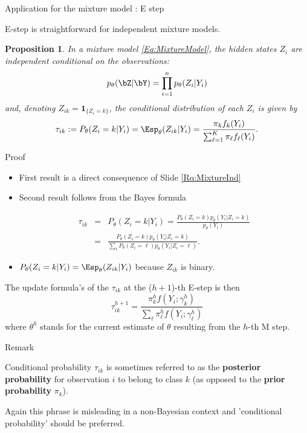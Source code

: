 \documentclass[compress,10pt]{beamer}
\newtheorem{proposition}{Proposition}
\begin{document}
 
\begin{frame}{Application for the mixture model : E step}
 
 E-step is straightforward for independent mixture models.
\label{Prop:LowerBound}
\begin{proposition} %
  In a mixture model \eqref{Eq:MixtureModel}, the hidden states $Z_i$ are independent conditional on the observations:
  $$
  p_\theta(\bZ|\bY) = \prod_{i=1}^n p_\theta(Z_i | Y_i)
  $$
  and, denoting $Z_{ik} = \mathbf{1}_{\{Z_i = k\}}$, the conditional distribution of each $Z_i$ is given by
  $$
  \tau_{ik} := P_\theta(Z_i = k | Y_i) = \Esp_\theta(Z_{ik} | Y_i) = \frac{\pi_k f_k(Y_i)}{\sum_{\ell = 1}^K \pi_\ell f_\ell(Y_i)}.
  $$
\end{proposition}
\end{frame}

\begin{frame}[allowframebreaks]{Proof}

\begin{itemize}
 \item First result is a direct consequence of Slide \ref{Rq:MixtureInd}
\item  Second result  follows from the Bayes formula

 
\begin{eqnarray*}
 \tau_{ik} &=& P_\theta(Z_i = k | Y_i) = \frac{P_\theta(Z_i = k) p_\theta(Y_i | Z_i = k)}{p_\theta(Y_i)} \\
 &=& \frac{P_\theta(Z_i = k) p_\theta(Y_i | Z_i = k)}{\sum_\ell P_\theta(Z_i = \ell) p_\theta(Y_i | Z_i = \ell)}.
\end{eqnarray*}

\item $P_\theta(Z_i = k | Y_i) = \Esp_\theta(Z_{ik} | Y_i)$   because $Z_{ik}$ is binary.
\end{itemize}


The update formula's of the $\tau_{ik}$ at the ($h+1$)-th E-step is then
$$
\tau^{h+1}_{ik} = \frac{{\pi}^h_k f(Y_i; {\gamma}^h_k)}{\sum_\ell {\pi}^h_\ell f(Y_i; {\gamma}^h_\ell)}
$$
where $\theta^h$ stands for the current estimate of $\theta$ resulting from the $h$-th M step.

\end{frame}


\begin{frame}{Remark}
 
 
Conditional probability $\tau_{ik}$ is sometimes referred to as the \textbf{\color{dgreen}  posterior probability} for observation $i$ to belong to class $k$ (as opposed to the \textbf{\color{dgreen} prior probability} $\pi_k$). 

Again this phrase is misleading in a non-Bayesian context and 'conditional probability' should be preferred.
\end{frame}
\end{document}
